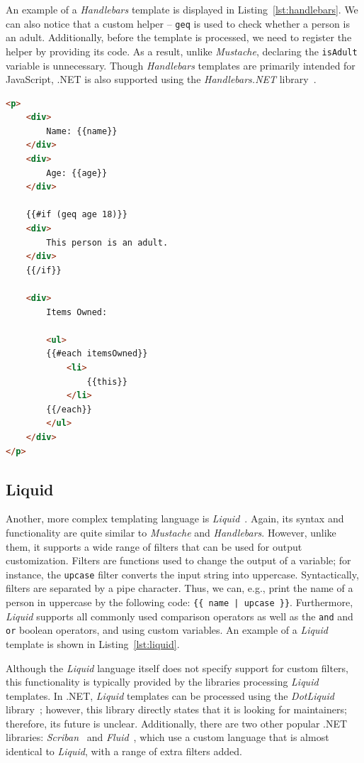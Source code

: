 An example of a \textit{Handlebars} template is displayed in Listing~\ref{lst:handlebars}.
We can also notice that a custom helper -- \texttt{geq} is used to check whether a person is an adult.
Additionally, before the template is processed, we need to register the helper by providing its code.
As a result, unlike \textit{Mustache}, declaring the \texttt{isAdult} variable is unnecessary.
Though \textit{Handlebars} templates are primarily intended for JavaScript, .NET is also supported using the \textit{Handlebars.NET} library~\cite{handlebars_net}.

\begin{listing}[H]
\begin{lstlisting}[language=HTML]
<p>
    <div>
        Name: {{name}}
    </div>
    <div>
        Age: {{age}}
    </div>
    
    {{#if (geq age 18)}}
    <div>
        This person is an adult.
    </div>
    {{/if}}
    
    <div>
        Items Owned:

        <ul>
        {{#each itemsOwned}}
            <li>
                {{this}}
            </li>
        {{/each}}
        </ul>
    </div>
</p>
\end{lstlisting}
\caption{Example \textit{Handlebars} template}
\label{lst:handlebars}
\end{listing}

\subsection{Liquid}

Another, more complex templating language is \textit{Liquid}~\cite{liquid}.
Again, its syntax and functionality are quite similar to \textit{Mustache} and \textit{Handlebars}.
However, unlike them, it supports a wide range of filters that can be used for output customization.
Filters are functions used to change the output of a variable; for instance, the \texttt{upcase} filter converts the input string into uppercase. 
Syntactically, filters are separated by a pipe character.
Thus, we can, e.g., print the name of a person in uppercase by the following code: \texttt{\{\{ name | upcase \}\}}.
Furthermore, \textit{Liquid} supports all commonly used comparison operators as well as the \texttt{and} and \texttt{or} boolean operators, and using custom variables.
An example of a \textit{Liquid} template is shown in Listing~\ref{lst:liquid}.

Although the \textit{Liquid} language itself does not specify support for custom filters, this functionality is typically provided by the libraries processing \textit{Liquid} templates.
In .NET, \textit{Liquid} templates can be processed using the \textit{DotLiquid} library~\cite{dotliquid}; however, this library directly states that it is looking for maintainers; therefore, its future is unclear.
Additionally, there are two other popular .NET libraries: \textit{Scriban}~\cite{scriban} and \textit{Fluid}~\cite{fluid}, which use a custom language that is almost identical to \textit{Liquid}, with a range of extra filters added.

